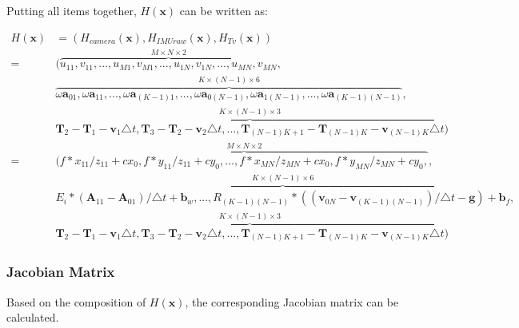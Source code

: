 \documentclass[12pt]{article}   %
\begin{document}
\begin{appendices}
Putting all items together, $H(\textbf{x})$ can be written as:

\begin{align} %
H(\textbf{x}) &= (H_{camera}(\textbf{x}), H_{IMUraw}(\textbf{x}), H_{Tv}(\textbf{x})) \nonumber \\
=& (\overbrace{{u}_{11}, {v}_{11}, ... , {u}_{M1}, {v}_{M1}, ..., {u}_{1N}, {v}_{1N}, ... , {u}_{MN}, {v}_{MN}}^{M \times N \times 2}, \nonumber \\ 
& \overbrace{\omega\textbf{a}_{01}, \omega\textbf{a}_{11}, ... , \omega\textbf{a}_{(K-1)1}, ..., \omega\textbf{a}_{0(N-1)}, \omega\textbf{a}_{1(N-1)}, ... , \omega\textbf{a}_{(K-1)(N-1)}}^{K \times (N-1) \times 6}, \nonumber \\
& \overbrace{\textbf{T}_2 - \textbf{T}_{1} - \textbf{v}_{1} \triangle t, \textbf{T}_{3} - \textbf{T}_{2} - \textbf{v}_{2} \triangle t, ... , \textbf{T}_{(N-1)K+1} - \textbf{T}_{(N-1)K} - \textbf{v}_{(N-1)K} \triangle t}^{K \times (N-1) \times 3}) \nonumber \\
=& (\overbrace{f * x_{11} / z_{11} + cx_0, f * y_{11} / z_{11} + cy_0, ... , f * x_{MN} / z_{MN} + cx_0, f * y_{MN} / z_{MN} + cy_0, }^{M \times N \times 2}, \nonumber \\ 
& \overbrace{E_i*(\textbf{A}_{11} - \textbf{A}_{01})/\triangle t + \textbf{b}_w, ..., R_{(K-1)(N-1)} * ((\textbf{v}_{0N} - \textbf{v}_{(K-1)(N-1)}) / \triangle t - \textbf{g}) + \textbf{b}_f}^{K \times (N-1) \times 6}, \nonumber \\
& \overbrace{\textbf{T}_2 - \textbf{T}_{1} - \textbf{v}_{1} \triangle t, \textbf{T}_{3} - \textbf{T}_{2} - \textbf{v}_{2} \triangle t, ... , \textbf{T}_{(N-1)K+1} - \textbf{T}_{(N-1)K} - \textbf{v}_{(N-1)K} \triangle t}^{K \times (N-1) \times 3}) 
\end{align}

\subsubsection{Jacobian Matrix}

Based on the composition of $H(\textbf{x})$, the corresponding Jacobian matrix can be calculated. 


\end{appendices}
\end{document}
